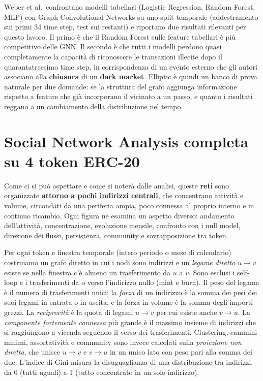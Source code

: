 \documentclass[11pt]{article}
\begin{document}
Weber et al.\ confrontano modelli tabellari (Logistic Regression, Random
Forest, MLP) con Graph Convolutional Networks su uno split temporale
(addestramento sui primi 34 time step, test sui restanti) e riportano due
risultati rilevanti per questo lavoro. Il primo è che il Random Forest sulle
feature tabellari è più competitivo delle GNN. Il secondo è che tutti i
modelli perdono quasi completamente la capacità di riconoscere le transazioni
illecite dopo il quarantatreesimo time step, in corrispondenza di un evento
esterno che gli autori associano alla \textbf{chiusura} di un \textbf{dark market}. Elliptic è
quindi un banco di prova naturale per due domande: se la struttura del grafo
aggiunga informazione rispetto a feature che già incorporano il vicinato a un
passo, e quanto i risultati reggano a un cambiamento della distribuzione nel
tempo.

\newpage
\section{Social Network Analysis completa su 4 token ERC-20}\label{sec:studioA}
Come ci si può aspettare e come si noterà dalle analisi, queste \textbf{reti} sono organizzate \textbf{attorno a pochi
indirizzi centrali}, che concentrano attività e volume, circondati da una
periferia ampia, poco connessa al proprio interno e in continuo ricambio.
Ogni figura ne esamina un aspetto diverso: andamento dell'attività,
concentrazione, evoluzione mensile, confronto con i null model, direzione
dei flussi, persistenza, community e sovrapposizione tra token.

Per ogni token e finestra temporale (intero periodo o mese di calendario)
costruiamo un grafo diretto in cui i nodi sono indirizzi e un \emph{legame
diretto} $u \to v$ esiste se nella finestra c'è almeno un trasferimento da
$u$ a $v$. Sono esclusi i self-loop e i trasferimenti da o verso l'indirizzo
nullo (mint e burn). Il peso del legame è il numero di trasferimenti unici;
la \emph{forza} di un indirizzo è la somma dei pesi dei suoi legami in
entrata o in uscita, e la forza in volume è la somma degli importi grezzi.
La \emph{reciprocità} è la quota di legami $u \to v$ per cui esiste anche
$v \to u$. La \emph{componente fortemente connessa} più grande è il massimo
insieme di indirizzi che si raggiungono a vicenda seguendo il verso dei
trasferimenti.
Clustering, cammini minimi, assortatività e community sono
invece calcolati sulla \emph{proiezione non diretta}, che unisce
$u \to v$ e $v \to u$ in un unico lato con peso pari alla somma dei due.
L'indice di Gini misura la disuguaglianza di una distribuzione tra
indirizzi, da 0 (tutti uguali) a 1 (tutto concentrato in un solo
indirizzo).
\end{document}
